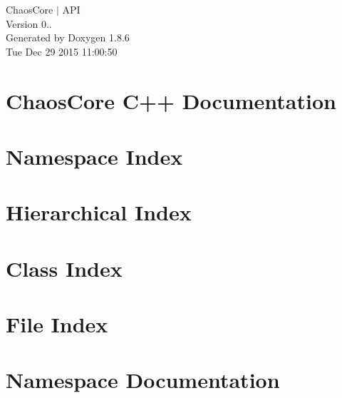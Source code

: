 \documentclass[twoside]{book}
\newcommand{\clearemptydoublepage}{%
  \newpage{\pagestyle{empty}\cleardoublepage}%
}
\begin{document}
\hypersetup{pageanchor=false}
\begin{titlepage}
\vspace*{7cm}
\begin{center}%
{\Large Chaos\-Core $\vert$ A\-P\-I \\[1ex]\large Version 0.. }\\
\vspace*{1cm}
{\large Generated by Doxygen 1.8.6}\\
\vspace*{0.5cm}
{\small Tue Dec 29 2015 11:00:50}\\
\end{center}
\end{titlepage}
\clearemptydoublepage
\tableofcontents
\clearemptydoublepage
{}
\hypersetup{pageanchor=true}

\chapter{Chaos\-Core C++ Documentation}
\label{index}\hypertarget{index}{}
\chapter{Namespace Index}

\chapter{Hierarchical Index}

\chapter{Class Index}

\chapter{File Index}

\chapter{Namespace Documentation}













\end{document}
